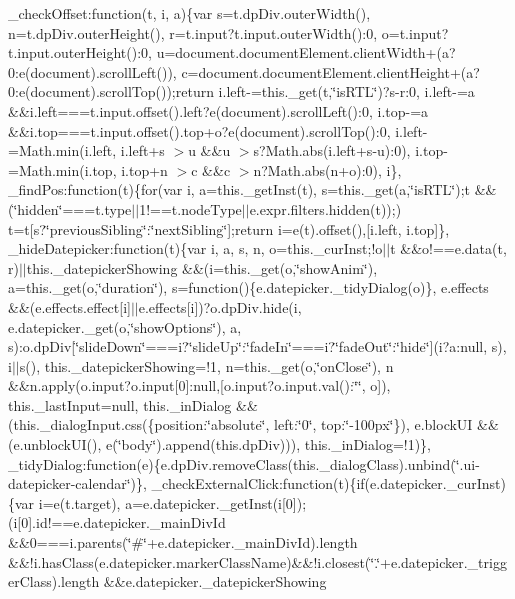 {{\begin{DoxyParamCaption}
\+\_\+check\+Offset\+:function(t, i, a)\{var s=t.\+dp\+Div.\+outer\+Width(), n=t.\+dp\+Div.\+outer\+Height(), r=t.\+input?t.\+input.\+outer\+Width()\+:0, o=t.\+input?t.\+input.\+outer\+Height()\+:0, u=document.\+document\+Element.\+client\+Width+(a?0\+:e(document).\+scroll\+Left()), c=document.\+document\+Element.\+client\+Height+(a?0\+:e(document).\+scroll\+Top());return i.\+left-\/=this.\+\_\+get(t,\char`\"{}is\+R\+T\+L\char`\"{})?s-\/r\+:0, i.\+left-\/=a \&\&i.\+left===t.\+input.\+offset().\+left?e(document).\+scroll\+Left()\+:0, i.\+top-\/=a \&\&i.\+top===t.\+input.\+offset().\+top+o?e(document).\+scroll\+Top()\+:0, i.\+left-\/=\+Math.\+min(i.\+left, i.\+left+s $>$u \&\&u $>$s?\+Math.\+abs(i.\+left+s-\/u)\+:0), i.\+top-\/=\+Math.\+min(i.\+top, i.\+top+n $>$c \&\&c $>$n?\+Math.\+abs(n+o)\+:0), i\}, \+\_\+find\+Pos\+:function(t)\{for(var i, a=this.\+\_\+get\+Inst(t), s=this.\+\_\+get(a,\char`\"{}is\+R\+T\+L\char`\"{});t \&\&(\char`\"{}hidden\char`\"{}===t.\+type$\vert$$\vert$1!==t.\+node\+Type$\vert$$\vert$e.\+expr.\+filters.\+hidden(t));) t=t\mbox{[}s?\char`\"{}previous\+Sibling\char`\"{}\+:\char`\"{}next\+Sibling\char`\"{}\mbox{]};return i=e(t).\+offset(),\mbox{[}i.\+left, i.\+top\mbox{]}\}, \+\_\+hide\+Datepicker\+:function(t)\{var i, a, s, n, o=this.\+\_\+cur\+Inst;!o$\vert$$\vert$t \&\&o!==e.\+data(t, r)$\vert$$\vert$this.\+\_\+datepicker\+Showing \&\&(i=this.\+\_\+get(o,\char`\"{}show\+Anim\char`\"{}), a=this.\+\_\+get(o,\char`\"{}duration\char`\"{}), s=function()\{e.\+datepicker.\+\_\+tidy\+Dialog(o)\}, e.\+effects \&\&(e.\+effects.\+effect\mbox{[}i\mbox{]}$\vert$$\vert$e.\+effects\mbox{[}i\mbox{]})?o.\+dp\+Div.\+hide(i, e.\+datepicker.\+\_\+get(o,\char`\"{}show\+Options\char`\"{}), a, s)\+:o.\+dp\+Div\mbox{[}\char`\"{}slide\+Down\char`\"{}===i?\char`\"{}slide\+Up\char`\"{}\+:\char`\"{}fade\+In\char`\"{}===i?\char`\"{}fade\+Out\char`\"{}\+:\char`\"{}hide\char`\"{}\mbox{]}(i?a\+:null, s), i$\vert$$\vert$s(), this.\+\_\+datepicker\+Showing=!1, n=this.\+\_\+get(o,\char`\"{}on\+Close\char`\"{}), n \&\&n.\+apply(o.\+input?o.\+input\mbox{[}0\mbox{]}\+:null,\mbox{[}o.\+input?o.\+input.\+val()\+:\char`\"{}\char`\"{}, o\mbox{]}), this.\+\_\+last\+Input=null, this.\+\_\+in\+Dialog \&\&(this.\+\_\+dialog\+Input.\+css(\{position\+:\char`\"{}absolute\char`\"{}, left\+:\char`\"{}0\char`\"{}, top\+:\char`\"{}-\/100px\char`\"{}\}), e.\+block\+U\+I \&\&(e.\+unblock\+U\+I(), e(\char`\"{}body\char`\"{}).\+append(this.\+dp\+Div))), this.\+\_\+in\+Dialog=!1)\}, \+\_\+tidy\+Dialog\+:function(e)\{e.\+dp\+Div.\+remove\+Class(this.\+\_\+dialog\+Class).\+unbind(\char`\"{}.\+ui-\/datepicker-\/calendar\char`\"{})\}, \+\_\+check\+External\+Click\+:function(t)\{if(e.\+datepicker.\+\_\+cur\+Inst)\{var i=e(t.\+target), a=e.\+datepicker.\+\_\+get\+Inst(i\mbox{[}0\mbox{]});(i\mbox{[}0\mbox{]}.\+id!==e.\+datepicker.\+\_\+main\+Div\+Id \&\&0===i.\+parents(\char`\"{}\#\char`\"{}+e.\+datepicker.\+\_\+main\+Div\+Id).\+length \&\&!i.\+has\+Class(e.\+datepicker.\+marker\+Class\+Name)\&\&!i.\+closest(\char`\"{}.\char`\"{}+e.\+datepicker.\+\_\+trigger\+Class).\+length \&\&e.\+datepicker.\+\_\+datepicker\+Showing 
\end{DoxyParamCaption}}}
